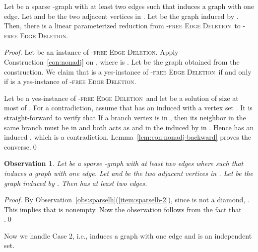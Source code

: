 \documentclass[envcountsame,envcountsect,10pt,oribibl]{llncs}
\newcommand{\pname}[1]{\textnormal{\textsc{#1}}}
\newcommand{\HED}{\pname{-free Edge Deletion}}
\newcommand{\HDED}{\pname{-free Edge Deletion}}
\newtheorem{observation}[lemma]{Observation}
\begin{document}
\begin{lemma}
  \label{lem:sparselh-vl}
  Let  be a sparse -graph with at least two edges 
  such that  induces a graph with one edge.
  Let  and  be the two adjacent vertices in .
  Let  be the graph induced by .
  Then, there is a linear parameterized reduction from \HDED\ to \HED.
\end{lemma}
\begin{proof}
  Let  be an instance of \HDED. Apply Construction~\ref{con:nonadj}
  on , where  is .
  Let  be the graph obtained from the construction. We claim that 
   is a yes-instance of \HDED\ if and only if  is a 
  yes-instance of \HED.

  Let  be a yes-instance of \HDED\ and let  be a solution of size
  at most  of . For a contradiction, assume that  has an induced
   with a vertex set . It is straight-forward to verify that 
  If a branch vertex  is in , then its neighbor in the same branch 
  must be in  and both acts as  and  in the 
  induced by  in . Hence  has an induced , which is a contradiction.
  Lemma~\ref{lem:con:nonadj-backward} proves the converse.\qed
\end{proof}

\begin{observation}
  \label{obs:sparselh-vl}
  Let  be a sparse -graph with at least two edges where 
  such that  induces a graph with one edge.
  Let  and  be the two adjacent vertices in .
  Let  be the graph induced by .
  Then  has at least two edges.
\end{observation}
\begin{proof}
  By Observation~\ref{obs:sparselh}(\ref{item:sparselh-2}), since  is not a diamond,
  . This implies that  is 
  nonempty. Now the observation follows from the fact that .\qed
\end{proof}

Now we handle Case 2, i.e.,  induces a graph with one edge and 
is an independent set.
\end{document}
